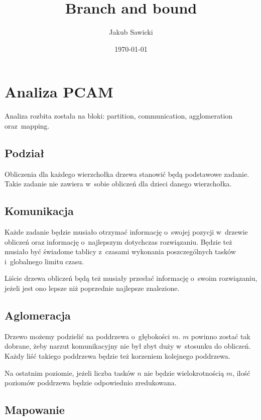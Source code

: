 \documentclass[a4paper; 12pt]{article}
\title{Branch and bound}
\author{Jakub Sawicki}
\date{\today}
\begin{document}
\renewcommand{\figurename}{Rys.}
\renewcommand{\tablename}{Tab.}
\renewcommand{\abstractname}{Abstrakt}

\maketitle

\section{Analiza PCAM}

Analiza rozbita została na bloki: partition, communication, agglomeration oraz~mapping.~\cite{foster}

\subsection{Podział}
Obliczenia dla każdego wierzchołka drzewa stanowić będą podstawowe zadanie.
Takie zadanie nie zawiera w~sobie obliczeń dla dzieci danego wierzchołka.

\subsection{Komunikacja}
Każde zadanie będzie musiało otrzymać informację o~swojej pozycji w~drzewie
obliczeń oraz informację o~najlepszym dotychczas rozwiązaniu.
Będzie też musiało być świadome tablicy z~czasami wykonania poszczególnych
tasków i~globalnego limitu czasu.

Liście drzewa obliczeń będą też musiały przesłać informację o~swoim
rozwiązaniu, jeżeli jest ono lepsze niż poprzednie najlepsze znalezione.

\subsection{Aglomeracja}

Drzewo możemy podzielić na poddrzewa o~głębokości $m$.
$m$ powinno zostać tak dobrane, żeby narzut komunikacyjny nie był zbyt duży
w~stosunku do obliczeń.
Każdy liść takiego poddrzewa będzie też korzeniem kolejnego poddrzewa.

Na ostatnim poziomie, jeżeli liczba tasków $n$ nie będzie wielokrotnością $m$,
ilość poziomów poddrzewa będzie odpowiednio zredukowana.

\subsection{Mapowanie}
\end{document}
